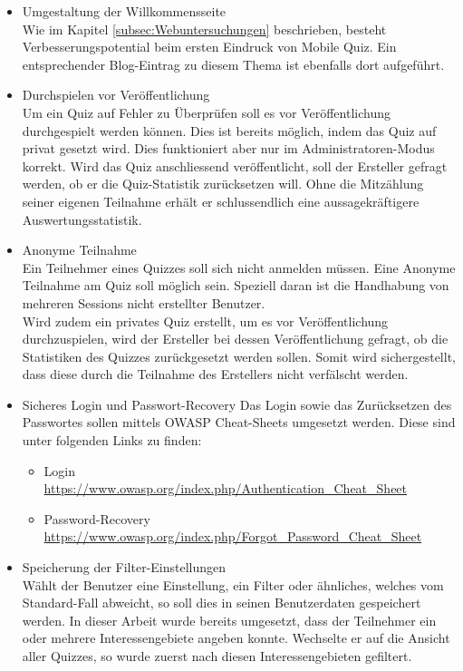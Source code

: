 \begin{itemize}
	\item Umgestaltung der Willkommensseite \\
	Wie im Kapitel \ref{subsec:Webuntersuchungen} beschrieben, besteht Verbesserungspotential beim ersten Eindruck von Mobile Quiz. Ein entsprechender Blog-Eintrag zu diesem Thema ist ebenfalls dort aufgeführt.
	
	\item Durchspielen vor Veröffentlichung \\
	Um ein Quiz auf Fehler zu Überprüfen soll es vor Veröffentlichung durchgespielt werden können. Dies ist bereits möglich, indem das Quiz auf privat gesetzt wird. Dies funktioniert aber nur im Administratoren-Modus korrekt.
	Wird das Quiz anschliessend veröffentlicht, soll der Ersteller gefragt werden, ob er die Quiz-Statistik zurücksetzen will. Ohne die Mitzählung seiner eigenen Teilnahme erhält er schlussendlich eine aussagekräftigere Auswertungsstatistik.
	
	\item Anonyme Teilnahme \\
	Ein Teilnehmer eines Quizzes soll sich nicht anmelden müssen. Eine Anonyme Teilnahme am Quiz soll möglich sein. Speziell daran ist die Handhabung von mehreren Sessions nicht erstellter Benutzer.\\
	Wird zudem ein privates Quiz erstellt, um es vor Veröffentlichung durchzuspielen, wird der Ersteller bei dessen Veröffentlichung gefragt, ob die Statistiken des Quizzes zurückgesetzt werden sollen. Somit wird sichergestellt, dass diese durch die Teilnahme des Erstellers nicht verfälscht werden.
	
	\item Sicheres Login und Passwort-Recovery
	Das Login sowie das Zurücksetzen des Passwortes sollen mittels OWASP Cheat-Sheets umgesetzt werden. Diese sind unter folgenden Links zu finden:
	\begin{itemize}
		\item Login \\
		\url{https://www.owasp.org/index.php/Authentication_Cheat_Sheet}
		\item Password-Recovery \\ \url{https://www.owasp.org/index.php/Forgot_Password_Cheat_Sheet}
	\end{itemize}
	
	\item Speicherung der Filter-Einstellungen \\
	Wählt der Benutzer eine Einstellung, ein Filter oder ähnliches, welches vom Standard-Fall abweicht, so soll dies in seinen Benutzerdaten gespeichert werden. In dieser Arbeit wurde bereits umgesetzt, dass der Teilnehmer ein oder mehrere Interessengebiete angeben konnte. Wechselte er auf die Ansicht aller Quizzes, so wurde zuerst nach diesen Interessengebieten gefiltert.
	

\end{itemize}
